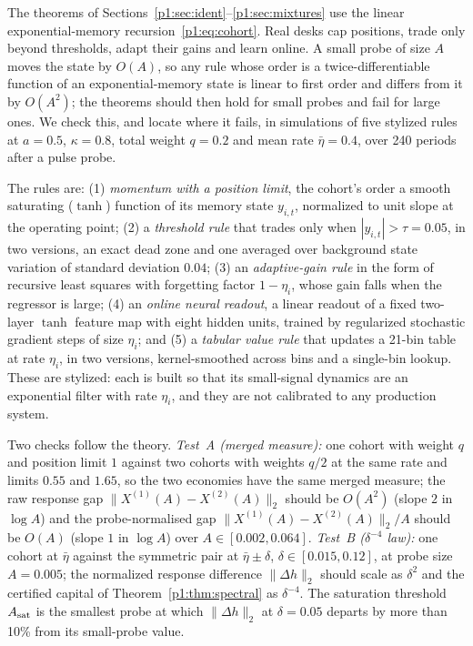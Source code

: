 The theorems of Sections~\ref{p1:sec:ident}--\ref{p1:sec:mixtures} use the linear exponential-memory recursion~\eqref{p1:eq:cohort}. Real desks cap positions, trade only beyond thresholds, adapt their gains and learn online. A small probe of size $A$ moves the state by $O(A)$, so any rule whose order is a twice-differentiable function of an exponential-memory state is linear to first order and differs from it by $O(A^2)$; the theorems should then hold for small probes and fail for large ones. We check this, and locate where it fails, in simulations of five stylized rules at $a=0.5$, $\kappa=0.8$, total weight $q=0.2$ and mean rate $\bar\eta=0.4$, over 240 periods after a pulse probe.

The rules are: (1) \emph{momentum with a position limit}, the cohort's order a smooth saturating ($\tanh$) function of its memory state $y_{i,t}$, normalized to unit slope at the operating point; (2) a \emph{threshold rule} that trades only when $|y_{i,t}|>\tau=0.05$, in two versions, an exact dead zone and one averaged over background state variation of standard deviation $0.04$; (3) an \emph{adaptive-gain rule} in the form of recursive least squares with forgetting factor $1-\eta_i$, whose gain falls when the regressor is large; (4) an \emph{online neural readout}, a linear readout of a fixed two-layer $\tanh$ feature map with eight hidden units, trained by regularized stochastic gradient steps of size $\eta_i$; and (5) a \emph{tabular value rule} that updates a 21-bin table at rate $\eta_i$, in two versions, kernel-smoothed across bins and a single-bin lookup. These are stylized: each is built so that its small-signal dynamics are an exponential filter with rate $\eta_i$, and they are not calibrated to any production system.

Two checks follow the theory. \emph{Test~A (merged measure):} one cohort with weight $q$ and position limit $1$ against two cohorts with weights $q/2$ at the same rate and limits $0.55$ and $1.65$, so the two economies have the same merged measure; the raw response gap $\|X^{(1)}(A)-X^{(2)}(A)\|_2$ should be $O(A^2)$ (slope $2$ in $\log A$) and the probe-normalised gap $\|X^{(1)}(A)-X^{(2)}(A)\|_2/A$ should be $O(A)$ (slope $1$ in $\log A$) over $A\in[0.002,0.064]$. \emph{Test~B ($\delta^{-4}$ law):} one cohort at $\bar\eta$ against the symmetric pair at $\bar\eta\pm\delta$, $\delta\in[0.015,0.12]$, at probe size $A=0.005$; the normalized response difference $\|\Delta h\|_2$ should scale as $\delta^2$ and the certified capital of Theorem~\ref{p1:thm:spectral} as $\delta^{-4}$. The saturation threshold $A_{\rm sat}$ is the smallest probe at which $\|\Delta h\|_2$ at $\delta=0.05$ departs by more than 10\% from its small-probe value.

